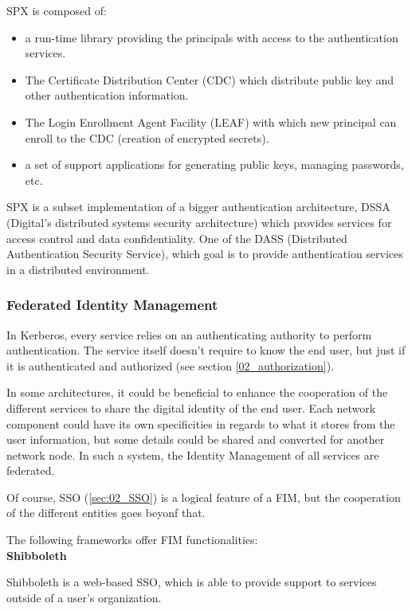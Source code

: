 SPX is composed of:
\begin{itemize}
	\item a run-time library providing the principals with access to the authentication services.
	\item The Certificate Distribution Center (CDC) which distribute public key and other authentication information.
	\item The Login Enrollment Agent Facility (LEAF) with which new principal can enroll to the CDC (creation of encrypted secrets).
	\item a set of support applications for generating public keys, managing passwords, etc.
\end{itemize}	  

SPX is a subset implementation of a bigger authentication architecture, DSSA (Digital's distributed systems security architecture)\cite{gasser1989digital} which provides services for access control and data confidentiality. One of the DASS (Distributed Authentication Security Service)\cite{kaufman1991distributed}, which goal is to provide authentication services in a distributed environment.

\subsubsection{Federated Identity Management} 
In Kerberos, every service relies on an authenticating authority to perform authentication. The service itself doesn't require to know the end user, but just if it is authenticated and authorized (see section \ref{02_authorization}).

In some architectures, it could be beneficial to enhance the cooperation of the different services to share the digital identity of the end user. Each network component could have its own specificities in regards to what it stores from the user information, but some details could be shared and converted for another network node. In such a system, the Identity Management of all services are federated.

Of course, SSO (\ref{sec:02_SSO}) is a logical feature of a FIM, but the cooperation of the different entities goes beyonf that. 

The following frameworks offer FIM functionalities: 
\\

\quad \tabitem \textbf{Shibboleth} 
\label{02_shibboleth}

Shibboleth\cite{erdos2002shibboleth} is a web-based SSO, which is able to provide support to services outside of a user's organization.
 
